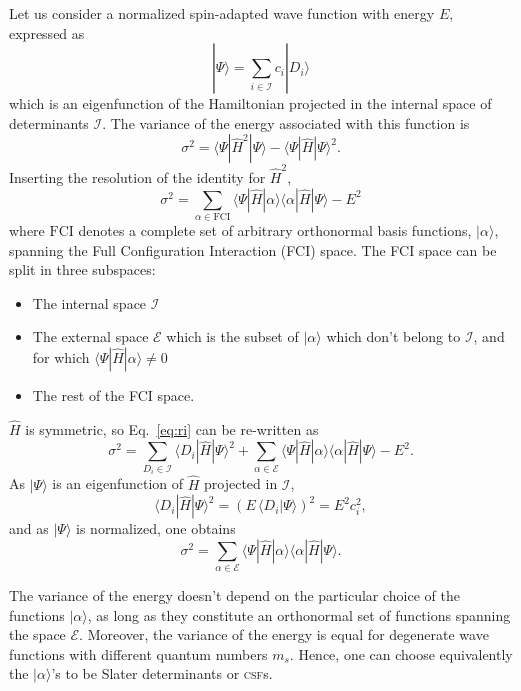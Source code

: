 \documentclass[aip,jcp,reprint,showkeys]{revtex4-1}
\newcommand{\ket}[1]{|#1\rangle}
\newcommand{\csf}{\textsc{csf}}
\newcommand{\mel}[3]{\langle #1 | #2 | #3 \rangle}
\begin{document}
Let us consider a normalized spin-adapted wave function with energy $E$, expressed as
\begin{equation}
\ket{\Psi} = \sum_{i \in \mathcal{I}} c_i \ket{D_i}
\end{equation}
which is an eigenfunction of the Hamiltonian projected in the internal space of
determinants $\mathcal{I}$.
The variance of the energy associated with this function is
\begin{equation}
\sigma^2 = \mel{\Psi}{\hat{H}^2}{\Psi} - \mel{\Psi}{\hat{H}}{\Psi}^2 .
\end{equation}
Inserting the resolution of the identity for $\hat{H}^2$, 
\begin{equation}
\sigma^2 = \sum_{\alpha \in \text{FCI}} \mel{\Psi}{\hat{H}}{\alpha} \mel{\alpha}{\hat{H}}{\Psi} - E^2
\label{eq:ri}
\end{equation}
where $\text{FCI}$ denotes a complete set of arbitrary orthonormal basis
functions, $\ket{\alpha}$, spanning the Full Configuration Interaction (FCI)
space.
The FCI space can be split in three subspaces:
\begin{itemize}
\item The internal space $\mathcal{I}$
\item The external space $\mathcal{E}$ which is the subset of $\ket{\alpha}$ which
      don't belong to $\mathcal{I}$, and for which $\mel{\Psi}{\hat{H}}{\alpha}
      \ne 0$
\item The rest of the FCI space.
\end{itemize}
$\hat{H}$ is symmetric, so Eq.~\eqref{eq:ri} can be re-written as
\begin{equation}
\sigma^2 = \sum_{D_i    \in \mathcal{I}} \mel{D_i}{\hat{H}}{\Psi}^2 
         + \sum_{\alpha \in \mathcal{E}} \mel{\Psi}{\hat{H}}{\alpha} \mel{\alpha}{\hat{H}}{\Psi} - E^2.
\end{equation}
As $\ket{\Psi}$ is an eigenfunction of $\hat{H}$ projected in $\mathcal{I}$, 
\begin{equation}
\mel{D_i}{\hat{H}}{\Psi}^2 = \left( E\, \langle D_i | \Psi \rangle \right)^2 = E^2 c_i^2,
\end{equation}
and as $\ket{\Psi}$ is normalized, one obtains
\begin{equation}
\sigma^2 = \sum_{\alpha \in \mathcal{E}} \mel{\Psi}{\hat{H}}{\alpha}\mel{\alpha}{\hat{H}}{\Psi}.
\end{equation} 

The variance of the energy doesn't depend on the particular choice of the
functions $\ket{\alpha}$, as long as they constitute an orthonormal set of
functions spanning the space $\mathcal{E}$. Moreover, the variance of the
energy is equal for degenerate wave functions with different quantum
numbers $m_s$.  Hence, one can choose equivalently the $\ket{\alpha}$'s to be
Slater determinants or \csf s.
\end{document}
